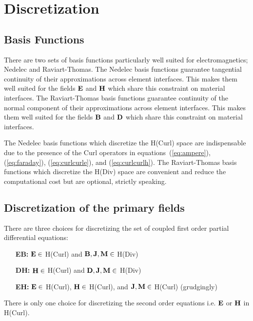 \documentclass[12pt]{article}
\providecommand{\B}{\mbox{\bf B}}
\providecommand{\E}{\mbox{\bf E}}
\providecommand{\D}{\mbox{\bf D}}
\renewcommand{\H}{\mbox{\bf H}}
\providecommand{\J}{\mbox{\bf J}}
\providecommand{\M}{\mbox{\bf M}}
\newcommand{\refEq}[1]{(\ref{eq:#1})}
\begin{document}
\section{Discretization}
\subsection{Basis Functions}

There are two sets of basis functions particularly well suited for
electromagnetics; Nedelec and Raviart-Thomas. The Nedelec basis
functions guarantee tangential continuity of their approximations
across element interfaces. This makes them well suited for the fields
$\E$ and $\H$ which share this constraint on material interfaces. The
Raviart-Thomas basis functions guarantee continuity of the normal
component of their approximations across element interfaces. This
makes them well suited for the fields $\B$ and $\D$ which share this
constraint on material interfaces.

The Nedelec basis functions which discretize the H(Curl) space are
indispensable due to the presence of the Curl operators in
equations~\refEq{ampere}, \refEq{faraday}, \refEq{curlcurle}, and
\refEq{curlcurlh}. The Raviart-Thomas basis functions which discretize
the H(Div) space are convenient and reduce the computational cost but
are optional, strictly speaking.

\subsection{Discretization of the primary fields}

There are three choices for discretizing the set of coupled first
order partial differential equations:
\begin{itemize}
\item[{\bf EB:}] $\E\in$ H(Curl) and $\B,\J,\M\in$ H(Div)
\item[{\bf DH:}] $\H\in$ H(Curl) and $\D,\J,\M\in$ H(Div)
\item[{\bf EH:}] $\E\in$ H(Curl), $\H\in$ H(Curl), and $\J,\M\in$
  H(Curl) (grudgingly)
\end{itemize}
There is only one choice for discretizing the second order equations
i.e. $\E$ or $\H$ in H(Curl).


\end{document}
